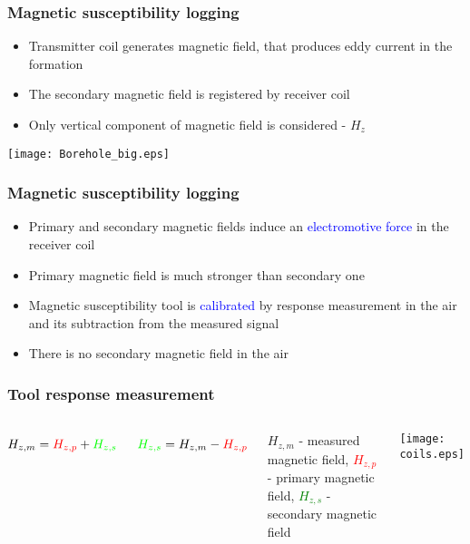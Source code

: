 \documentclass[aspectratio=169]{beamer}
\begin{document}
\begin{frame}
\frametitle{Magnetic susceptibility logging}
\begin{itemize}
\item Transmitter coil generates magnetic field, that produces eddy current in the formation 
\item The secondary magnetic field is registered by receiver coil
\item Only vertical component of magnetic field is considered - $H_z$
\end{itemize}
\begin{center}
\texttt{[image: Borehole\_big.eps]}
\end{center}
\end{frame}
%
%
\begin{frame}
\frametitle{Magnetic susceptibility logging}
\begin{itemize}
\item Primary and secondary magnetic fields induce an \textcolor{blue} {electromotive force} in the receiver coil
\item Primary magnetic field is much stronger than secondary one
\item Magnetic susceptibility tool is \textcolor{blue} {calibrated} by response measurement in the air and its subtraction from the measured signal 
\item There is no secondary magnetic field in the air
\end{itemize}
\end{frame}
%
%
\begin{frame}
\frametitle{Tool response measurement}


\begin{columns}[c] %

{
\begin{equation}
H_{z,m} =\textcolor{red}{H_{z,p}} + \textcolor{green}{H_{z,s}}
\end{equation}
}

\begin{equation}
\textcolor{green}{H_{z,s}} = H_{z,m} - \textcolor{red}{H_{z,p}}
\end{equation}

\vspace{\baselineskip}
$H_{z,m}$ - measured magnetic field, \textcolor{red}{$H_{z,p}$} - primary magnetic field, \textcolor{green}{$H_{z,s}$} - secondary magnetic field



\texttt{[image: coils.eps]}
\end{columns}

\end{frame}
\end{document}
